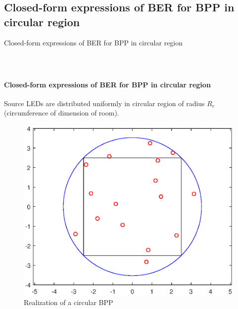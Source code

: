 \documentclass[slidestop,usepdftitle=false]{gvvslides}
\begin{document}
\subsection{Closed-form expressions of BER for BPP in circular region}
\begin{frame}
\vfill
\centering
Closed-form expressions of BER for BPP in circular region
\vfill
\end{frame}
\begin{frame}
\frametitle{\,}
\framesubtitle{Closed-form expressions of BER for BPP in circular region}
\vfill
Source LEDs are distributed uniformly in circular region of radius $R_c$(circumference of dimension of room).
\begin{figure}
        \centering
        \includegraphics[width=.6\framewidth]{LEDArrangementCircumcircle}
        \caption{Realization of a circular BPP}
        \end{figure}
\end{frame}
\end{document}
